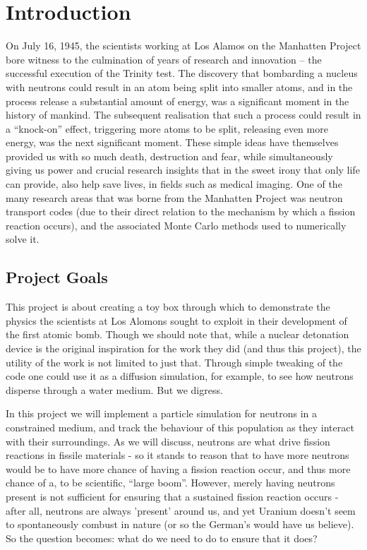 

\section{Introduction}

On July 16, 1945, the scientists working at Los Alamos on the Manhatten Project bore witness to the culmination of years 
of research and innovation -- the successful execution of the Trinity test. The discovery that bombarding a nucleus with neutrons 
could result in an atom being split into smaller atoms, and in the process release a substantial amount of energy, was 
a significant moment in the history of mankind. The subsequent realisation that such a process could result in a ``knock-on'' effect, 
triggering more atoms to be split, releasing even more energy, was the next significant moment. These simple ideas have themselves 
provided us with so much death, destruction and fear, while simultaneously giving us power and crucial research insights that in the 
sweet irony that only life can provide, also help save lives, in fields such as medical imaging. One of the many 
research areas that was borne from the Manhatten Project was neutron transport codes (due to their direct relation 
to the mechanism by which a fission reaction occurs), and the associated Monte Carlo methods used to numerically solve 
it.



\subsection{Project Goals}

This project is about creating a toy box through which to demonstrate the physics the scientists at Los Alomons sought to exploit 
in their development of the first atomic bomb. Though we should note that, while a nuclear detonation device is the original 
inspiration for the work they did (and thus this project), the utility of the work is not limited to just that. Through simple 
tweaking of the code one could use it as a diffusion simulation, for example, to see how neutrons disperse through a water medium. But 
we digress. 

In this project we will implement a particle simulation for neutrons in a constrained medium, and track the behaviour of this population 
as they interact with their surroundings. As we will discuss, neutrons are what drive fission reactions in fissile materials - so it 
stands to reason that to have more neutrons would be to have more chance of having a fission reaction occur, and thus more chance of a, 
to be scientific, ``large boom''. However, merely having neutrons present is not sufficient for ensuring that a sustained fission reaction occurs 
- after all, neutrons are always 'present' around us, and yet Uranium doesn't seem to spontaneously combust in nature (or so the German's would have 
us believe). So the question becomes: what do we need to do to ensure that it does? 

